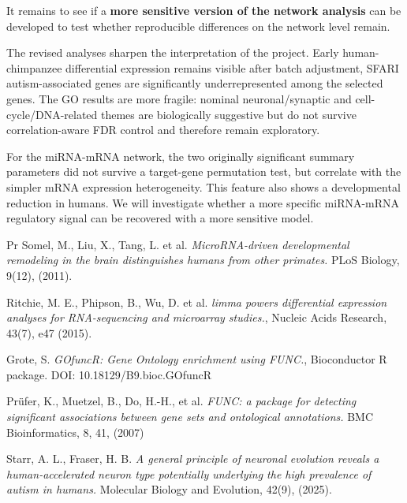 \documentclass[11pt,letterpaper]{article}
\newcommand{\heading}[1]{\par\vspace{3pt}{\Large\bfseries #1}\par\vspace{0pt}}
\begin{document}
It remains to see if a \textbf{more sensitive version of the network analysis} can be developed to test whether reproducible differences on the network level remain. 

\newpage

\heading{Discussion}
The revised analyses sharpen the interpretation of the project. Early human-chimpanzee differential expression remains visible after batch adjustment, SFARI autism-associated genes are significantly underrepresented among the selected genes. The GO results are more fragile: nominal neuronal/synaptic and cell-cycle/DNA-related themes are biologically suggestive but do not survive correlation-aware FDR control and therefore remain exploratory.

For the miRNA-mRNA network, the two originally significant summary parameters did not survive a target-gene permutation test, but correlate with the simpler mRNA expression heterogeneity. This feature also shows a developmental reduction in humans. We will investigate whether a more specific miRNA-mRNA regulatory signal can be recovered with a more sensitive model.



\begin{thebibliography}{Pr}
Somel, M., Liu, X., Tang, L. et al. \textit{MicroRNA-driven developmental remodeling in the brain distinguishes humans from other primates.} PLoS Biology, 9(12), (2011).

Ritchie, M. E., Phipson, B., Wu, D. et al. \textit{limma powers differential expression analyses for RNA-sequencing and microarray studies.}, Nucleic Acids Research, 43(7), e47 (2015).

Grote, S. \textit{GOfuncR: Gene Ontology enrichment using FUNC.}, Bioconductor R package. DOI: 10.18129/B9.bioc.GOfuncR

Prüfer, K., Muetzel, B., Do, H.-H., et al. \textit{FUNC: a package for detecting significant associations between gene sets and ontological annotations.} BMC Bioinformatics, 8, 41, (2007)


Starr, A. L., Fraser, H. B. \textit{A general principle of neuronal evolution reveals a human-accelerated neuron type potentially underlying the high prevalence of autism in humans.} Molecular Biology and Evolution, 42(9), (2025). 
\end{thebibliography}
\end{document}
